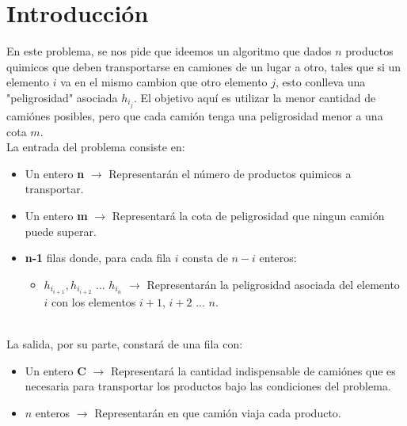 \section{Introducci\'on}
En este problema, se nos pide que ideemos un algoritmo que dados $n$ productos quimicos que deben transportarse en camiones de un lugar a otro, tales que si un elemento $i$ va en el mismo cambion que otro elemento $j$, esto conlleva una "peligrosidad" asociada $h_i_j$. El objetivo aqu\'i es utilizar la menor cantidad de cami\'ones posibles, pero que cada cami\'on tenga una peligrosidad menor a una cota $m$.
\\
La entrada del problema consiste en:
\\
\begin{itemize}
\item Un entero \textbf{n} $\rightarrow$ Representar\'an el n\'umero de productos quimicos a transportar.
\item Un entero \textbf{m} $\rightarrow$ Representar\'a la cota de peligrosidad que ningun cami\'on puede superar.
\item \textbf{n-1} filas donde, para cada fila $i$ consta de $n-i$ enteros:
\begin{itemize}
\item $h_i_{i+1}, h_i_{i+2}$ ... $h_i_{n}$ $\rightarrow$ Representar\'an la peligrosidad asociada del elemento $i$ con los elementos $i+1$, $i+2$ ... $n$.
\end{itemize}
\end{itemize}
\\
La salida, por su parte, constar\'a de una fila con:
\\
\begin{itemize}
\item Un entero \textbf{C} $\rightarrow$ Representar\'a la cantidad indispensable de cami\'ones que es necesaria para transportar los productos bajo las condiciones del problema.
\item $n$ enteros $\rightarrow$ Representar\'an en que cami\'on viaja cada producto.
\end{itemize}

